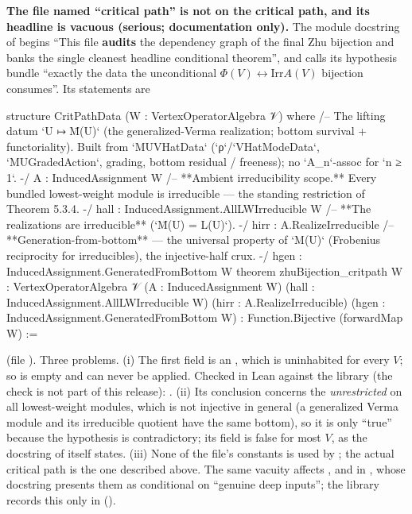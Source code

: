 \begin{warning}
\textbf{The file named ``critical path'' is not on the critical path, and its headline is vacuous (serious; documentation only).} The module docstring of
 begins ``This file \textbf{audits} the dependency graph of
the final Zhu bijection and banks the single cleanest headline conditional theorem'', and calls its hypothesis bundle ``exactly the data
the unconditional $\Phi(V)\leftrightarrow\mathrm{Irr}A(V)$ bijection consumes''. Its statements are
\begin{leancode}
structure CritPathData (W : VertexOperatorAlgebra 𝒱) where
  /-- The lifting datum `U ↦ M̄(U)` (the generalized-Verma realization; bottom survival +
  functoriality).  Built from `MUVHatData` (`ρ`/`VHatModeData`, `MUGradedAction`, grading,
  bottom residual / freeness); no `A_n`-assoc for `n ≥ 1`. -/
  A : InducedAssignment W
  /-- **Ambient irreducibility scope.** Every bundled lowest-weight module is irreducible — the
  standing restriction of Theorem 5.3.4. -/
  hall : InducedAssignment.AllLWIrreducible W
  /-- **The realizations are irreducible** (`M̄(U) = L(U)`). -/
  hirr : A.RealizeIrreducible
  /-- **Generation-from-bottom** — the universal property of `M(U)` (Frobenius reciprocity for
  irreducibles), the injective-half crux. -/
  hgen : InducedAssignment.GeneratedFromBottom W
theorem zhuBijection_critpath {W : VertexOperatorAlgebra 𝒱}
    (A : InducedAssignment W)
    (hall : InducedAssignment.AllLWIrreducible W)
    (hirr : A.RealizeIrreducible)
    (hgen : InducedAssignment.GeneratedFromBottom W) :
    Function.Bijective (forwardMap W) :=
\end{leancode}
(file ). Three problems. (i) The first field is an
, which is uninhabited for every $V$; so  is empty and  can
never be applied. Checked in Lean against the library (the check is not part of this release):
. (ii) Its
conclusion concerns the \emph{unrestricted}  on all lowest-weight modules, which is not injective in general (a
generalized Verma module and its irreducible quotient have the same bottom), so it is only ``true'' because the hypothesis is
contradictory; its  field is false for most $V$, as the docstring of
 itself states. (iii) None of the file's constants is used by ; the
actual critical path is the one described above. The same vacuity affects ,
 and  in
, whose docstring presents them as conditional on ``genuine deep inputs''; the library
records this only in  ().
\end{warning}

